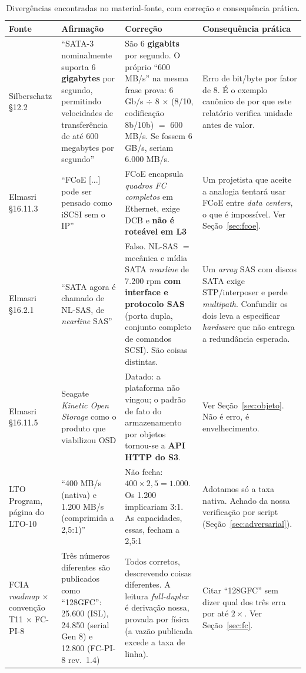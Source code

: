 \documentclass[11pt,a4paper]{article}
\begin{document}
\begin{table}[H]
\centering
\caption{Divergências encontradas no material-fonte, com correção e consequência prática.}
\label{tab:correcoes}
{\footnotesize
\begin{tabular}{@{}p{2.5cm}p{4.6cm}p{4.0cm}p{3.4cm}@{}}
\toprule
\textbf{Fonte} & \textbf{Afirmação} & \textbf{Correção} & \textbf{Consequência prática} \\
\midrule
Silberschatz §12.2 & ``SATA-3 nominalmente suporta 6 \textbf{gigabytes} por segundo, permitindo
velocidades de transferência de até 600 megabytes por segundo'' \cite{silberschatz2020} &
São 6 \textbf{gigabits} por segundo. O próprio ``600 MB/s'' na mesma frase prova: $6$ Gb/s
$\div$ 8 $\times$ (8/10, codificação 8b/10b) $=$ 600 MB/s. Se fossem 6 GB/s, seriam 6.000 MB/s. &
Erro de bit/byte por fator de 8. É o exemplo canônico de por que este relatório verifica unidade
antes de valor. \\
\addlinespace
Elmasri §16.11.3 & ``FCoE [...] pode ser pensado como iSCSI sem o IP'' \cite{elmasri2018} &
FCoE encapsula \emph{quadros FC completos} em Ethernet, exige DCB e \textbf{não é roteável em
L3} \cite{fcbb5} & Um projetista que aceite a analogia tentará usar FCoE entre \textit{data
centers}, o que é impossível. Ver Seção~\ref{sec:fcoe}. \\
\addlinespace
Elmasri §16.2.1 & ``SATA agora é chamado de NL-SAS, de \textit{nearline} SAS''
\cite{elmasri2018} & Falso. NL-SAS $=$ mecânica e mídia SATA \textit{nearline} de 7.200 rpm
\textbf{com interface e protocolo SAS} (porta dupla, conjunto completo de comandos SCSI). São coisas
distintas. & Um \textit{array} SAS com discos SATA exige STP/interposer e perde \textit{multipath}.
Confundir os dois leva a especificar \textit{hardware} que não entrega a redundância esperada. \\
\addlinespace
Elmasri §16.11.5 & Seagate \textit{Kinetic Open Storage} como o produto que viabilizou OSD
\cite{elmasri2018} & Datado: a plataforma não vingou; o padrão de fato do armazenamento por objetos
tornou-se a \textbf{API HTTP do S3}. & Ver Seção~\ref{sec:objeto}. Não é erro, é envelhecimento. \\
\addlinespace
LTO Program, página do LTO-10 & ``400 MB/s (nativa) e 1.200 MB/s (comprimida a 2,5:1)''
\cite{lto10} & Não fecha: $400 \times 2{,}5 = 1.000$. Os 1.200 implicariam 3:1. As capacidades, essas,
fecham a 2,5:1 & Adotamos só a taxa nativa. Achado da nossa verificação por script
(Seção~\ref{sec:adversarial}). \\
\addlinespace
FCIA \textit{roadmap} $\times$ convenção T11 $\times$ FC-PI-8 & Três números diferentes são
publicados como ``128GFC'': 25.600 (ISL), 24.850 (serial Gen 8) e 12.800 (FC-PI-8 rev.\ 1.4)
\cite{fciaroadmap,fcia128} & Todos corretos, descrevendo coisas diferentes. A leitura
\textit{full-duplex} é derivação nossa, provada por física (a vazão publicada excede a taxa de
linha). & Citar ``128GFC'' sem dizer qual dos três erra por até $2\times$. Ver
Seção~\ref{sec:fc}. \\
\bottomrule
\end{tabular}}
\end{table}
\end{document}
